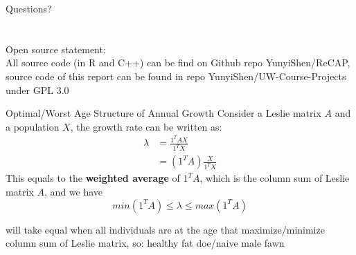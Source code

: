 \documentclass{beamer}
\begin{document}

\begin{frame}
	\LARGE{Questions?}
	\\
	\\
	\\
	{\footnotesize Open source statement: \\
	 All source code (in R and C++) can be find on Github repo YunyiShen/ReCAP, source code of this report can be found in repo  YunyiShen/UW-Course-Projects under GPL 3.0}
\end{frame}

\begin{frame}{Optimal/Worst Age Structure of Annual Growth}
	Consider a Leslie matrix $A$ and a population $X$, the growth rate can be written as:
	\[
	\begin{aligned}
	\lambda&=\frac{1^TAX}{1^TX}\\
	&=(1^TA)\frac{X}{1^TX}
	\end{aligned}
	\]
	This equals to the \textbf{weighted average} of $1^TA$, which is the column sum of Leslie matrix $A$, and we have
	\[
	min(1^TA) \le \lambda \le max(1^TA)
	\]
	
	will take equal when all individuals are at the age that maximize/minimize column sum of Leslie matrix, so: healthy fat doe/naive male fawn
\end{frame}
\end{document}

